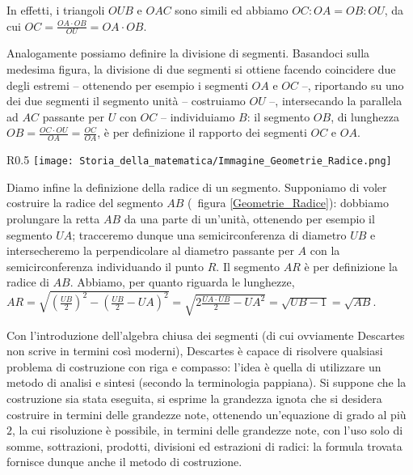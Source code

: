 \par In effetti, i triangoli $OUB$ e $OAC$ sono simili ed abbiamo $OC:OA=OB:OU$, da cui $OC = \frac{OA \cdot OB}{OU} = OA \cdot OB$.
\par Analogamente possiamo definire la divisione di segmenti. Basandoci sulla medesima figura, la divisione di due segmenti si ottiene facendo coincidere due degli estremi -- ottenendo per esempio i segmenti $OA$ e $OC$ --, riportando su uno dei due segmenti il segmento unit\`a -- costruiamo $OU$ --, intersecando la parallela ad $AC$ passante per $U$ con $OC$ -- individuiamo $B$: il segmento $OB$, di lunghezza $OB = \frac{OC \cdot OU}{OA} = \frac{OC}{OA}$, \`e per definizione il rapporto dei segmenti $OC$ e $OA$.
\begin{wrapfigure}{R}{0.5\textwidth}
	\texttt{[image: Storia\_della\_matematica/Immagine\_Geometrie\_Radice.png]}
	\caption{Definizione della radice di un segmento.}
	\label{Geometrie_Radice}
\end{wrapfigure}
\par Diamo infine la definizione della radice di un segmento. Supponiamo di voler costruire la radice del segmento $AB$ (\Cfr\ figura \ref{Geometrie_Radice}): dobbiamo prolungare la retta $AB$ da una parte di un'unit\`a, ottenendo per esempio il segmento $UA$; tracceremo dunque una semicirconferenza di diametro $UB$ e intersecheremo la perpendicolare al diametro passante per $A$ con la semicirconferenza individuando il punto $R$. Il segmento $AR$ \`e per definizione la radice di $AB$. Abbiamo, per quanto riguarda le lunghezze, $AR = \sqrt{ \left ( \frac{UB}{2} \right ) ^2 - \left ( \frac{UB}{2} - UA \right )^2 } = \sqrt{ 2 \frac{UA \cdot UB}{2} - UA^2} = \sqrt{UB - 1} = \sqrt{AB}$.
\par Con l'introduzione dell'algebra chiusa dei segmenti (di cui ovviamente Descartes non scrive in termini cos\`i moderni), Descartes \`e capace di risolvere qualsiasi problema di costruzione con riga e compasso: l'idea \`e quella di utilizzare un metodo di analisi e sintesi (secondo la terminologia pappiana). Si suppone che la costruzione sia stata eseguita, si esprime la grandezza ignota che si desidera costruire in termini delle grandezze note, ottenendo un'equazione di grado al pi\`u $2$, la cui risoluzione \`e possibile, in termini delle grandezze note, con l'uso solo di somme, sottrazioni, prodotti, divisioni ed estrazioni di radici: la formula trovata fornisce dunque anche il metodo di costruzione.
